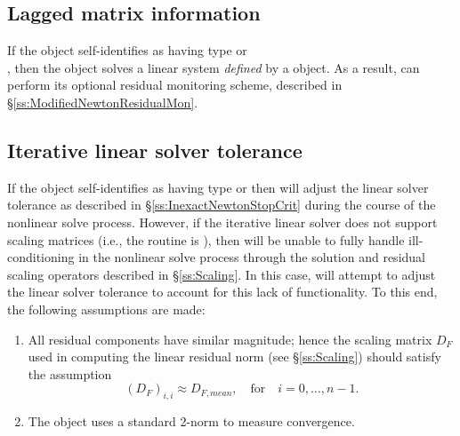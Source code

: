 \subsection{Lagged matrix information}
\label{ss:sunlinsol_lagged_matrix}

If the {\sunlinsol} object self-identifies as having type
 or \\ \noindent
{}, then the {\sunlinsol} object solves a
linear system \emph{defined} by a {\sunmatrix} object. As a result,
{\kinsol} can perform its optional residual monitoring scheme,
described in \S\ref{ss:ModifiedNewtonResidualMon}.

\subsection{Iterative linear solver tolerance}
\label{ss:sunlinsol_iterative_tolerance}

If the {\sunlinsol} object self-identifies as having type
 or \newline
{} then {\kinls} will adjust the linear solver
tolerance  as described in \S\ref{ss:InexactNewtonStopCrit} 
during the course of the nonlinear solve process. However, if the
iterative linear solver does not support scaling matrices (i.e., the
 routine is ), then {\kinls} will
be unable to fully handle ill-conditioning in the nonlinear solve process
through the solution and residual scaling operators described in
\S\ref{ss:Scaling}. In this case, {\kinls} will attempt to adjust the linear
solver tolerance to account for this lack of functionality. To this end, the
following assumptions are made:
\begin{enumerate}
\item All residual components have similar magnitude; hence the
  scaling matrix $D_F$ used in computing the linear residual norm (see
  \S\ref{ss:Scaling}) should satisfy the assumption 
  \[
    (D_F)_{i,i} \approx D_{F,mean},\quad \text{for}\quad i=0,\ldots,n-1.
  \]
\item The {\sunlinsol} object uses a standard 2-norm to measure
  convergence.
\end{enumerate}

